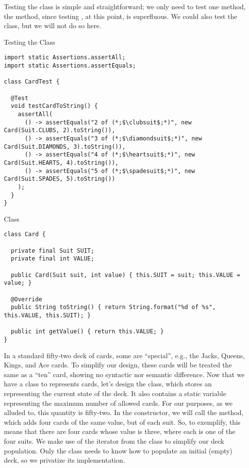 Testing the  class is simple and straightforward; we only need to test one method, the  method, since testing , at this point, is superfluous. We could also test the  class, but we will not do so here.

\begin{cl}{Testing the  Class}
\begin{lstlisting}[language=MyJava]
import static Assertions.assertAll;
import static Assertions.assertEquals;

class CardTest {

  @Test
  void testCardToString() {
    assertAll(
      () -> assertEquals("2 of (*;$\clubsuit$;*)", new Card(Suit.CLUBS, 2).toString()),
      () -> assertEquals("3 of (*;$\diamondsuit$;*)", new Card(Suit.DIAMONDS, 3).toString()),
      () -> assertEquals("4 of (*;$\heartsuit$;*)", new Card(Suit.HEARTS, 4).toString()),
      () -> assertEquals("5 of (*;$\spadesuit$;*)", new Card(Suit.SPADES, 5).toString())
    );
  }
}
\end{lstlisting}
\end{cl}

\begin{cl}{ Class}
\begin{lstlisting}[language=MyJava]
class Card {

  private final Suit SUIT;
  private final int VALUE;

  public Card(Suit suit, int value) { this.SUIT = suit; this.VALUE = value; }
  
  @Override
  public String toString() { return String.format("%d of %s", this.VALUE, this.SUIT); }

  public int getValue() { return this.VALUE; } 
}
\end{lstlisting}
\end{cl}

In a standard fifty-two deck of cards, some are ``special'', e.g., the Jacks, Queens, Kings, and Ace cards. To simplify our design, these cards will be treated the same as a ``ten'' card, showing no syntactic nor semantic difference. Now that we have a class to represents cards, let's design the  class, which stores an  representing the current state of the deck. It also contains a static variable representing the maximum number of allowed cards. For our purposes, as we alluded to, this quantity is fifty-two. In the  constructor, we will call the  method, which adds four cards of the same value, but of each suit. So, to exemplify, this means that there are four cards whose value is three, where each is one of the four suits. We make use of the iterator from the  class to simplify our deck population. Only the  class needs to know how to populate an initial (empty) deck, so we privatize its implementation.


